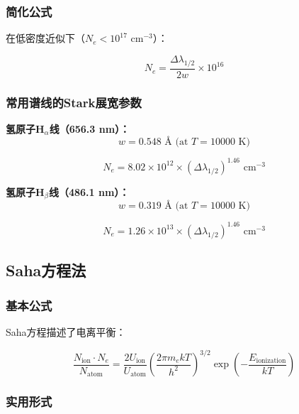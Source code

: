 \documentclass[12pt,a4paper]{article}
\begin{document}
\subsubsection{简化公式}

在低密度近似下（$N_e < 10^{17}$ cm$^{-3}$）：

\begin{equation}
\boxed{N_e = \frac{\Delta\lambda_{1/2}}{2w} \times 10^{16}}
\end{equation}

\subsubsection{常用谱线的Stark展宽参数}

\textbf{氢原子H$_\alpha$线（656.3 nm）：}
\begin{equation}
w = 0.548 \text{ Å (at } T = 10000 \text{ K)}
\end{equation}

\begin{equation}
\boxed{N_e = 8.02 \times 10^{12} \times (\Delta\lambda_{1/2})^{1.46} \text{ cm}^{-3}}
\end{equation}

\textbf{氢原子H$_\beta$线（486.1 nm）：}
\begin{equation}
w = 0.319 \text{ Å (at } T = 10000 \text{ K)}
\end{equation}

\begin{equation}
\boxed{N_e = 1.26 \times 10^{13} \times (\Delta\lambda_{1/2})^{1.46} \text{ cm}^{-3}}
\end{equation}

\subsection{Saha方程法}

\subsubsection{基本公式}

Saha方程描述了电离平衡：

\begin{equation}
\frac{N_{\text{ion}} \cdot N_e}{N_{\text{atom}}} = \frac{2U_{\text{ion}}}{U_{\text{atom}}} \left(\frac{2\pi m_e kT}{h^2}\right)^{3/2} \exp\left(-\frac{E_{\text{ionization}}}{kT}\right)
\end{equation}

\subsubsection{实用形式}
\end{document}
